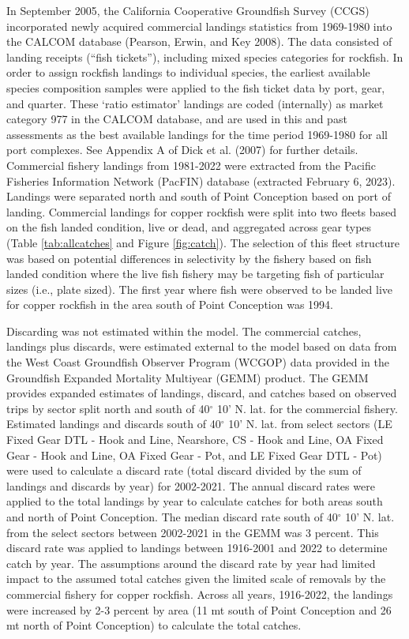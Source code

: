 \documentclass[11pt,
  english,
  letterpaper,
]{article}
\begin{document}
In September 2005, the California Cooperative Groundfish Survey (CCGS) incorporated newly acquired commercial landings statistics from 1969-1980 into the CALCOM database (Pearson, Erwin, and Key 2008). The data consisted of landing receipts (``fish tickets''), including mixed species categories for rockfish. In order to assign rockfish landings to individual species, the earliest available species composition samples were applied to the fish ticket data by port, gear, and quarter. These `ratio estimator' landings are coded (internally) as market category 977 in the CALCOM database, and are used in this and past assessments as the best available landings for the time period 1969-1980 for all port complexes. See Appendix A of Dick et al. (2007) for further details. Commercial fishery landings from 1981-2022 were extracted from the Pacific Fisheries Information Network (PacFIN) database (extracted February 6, 2023). Landings were separated north and south of Point Conception based on port of landing. Commercial landings for copper rockfish were split into two fleets based on the fish landed condition, live or dead, and aggregated across gear types (Table \ref{tab:allcatches} and Figure \ref{fig:catch}). The selection of this fleet structure was based on potential differences in selectivity by the fishery based on fish landed condition where the live fish fishery may be targeting fish of particular sizes (i.e., plate sized). The first year where fish were observed to be landed live for copper rockfish in the area south of Point Conception was 1994.

Discarding was not estimated within the model. The commercial catches, landings plus discards, were estimated external to the model based on data from the West Coast Groundfish Observer Program (WCGOP) data provided in the Groundfish Expanded Mortality Multiyear (GEMM) product. The GEMM provides expanded estimates of landings, discard, and catches based on observed trips by sector split north and south of 40\(^\circ\) 10' N. lat. for the commercial fishery. Estimated landings and discards south of 40\(^\circ\) 10' N. lat. from select sectors (LE Fixed Gear DTL - Hook and Line, Nearshore, CS - Hook and Line, OA Fixed Gear - Hook and Line, OA Fixed Gear - Pot, and LE Fixed Gear DTL - Pot) were used to calculate a discard rate (total discard divided by the sum of landings and discards by year) for 2002-2021. The annual discard rates were applied to the total landings by year to calculate catches for both areas south and north of Point Conception. The median discard rate south of 40\(^\circ\) 10' N. lat. from the select sectors between 2002-2021 in the GEMM was 3 percent. This discard rate was applied to landings between 1916-2001 and 2022 to determine catch by year. The assumptions around the discard rate by year had limited impact to the assumed total catches given the limited scale of removals by the commercial fishery for copper rockfish. Across all years, 1916-2022, the landings were increased by 2-3 percent by area (11 mt south of Point Conception and 26 mt north of Point Conception) to calculate the total catches.
\end{document}
